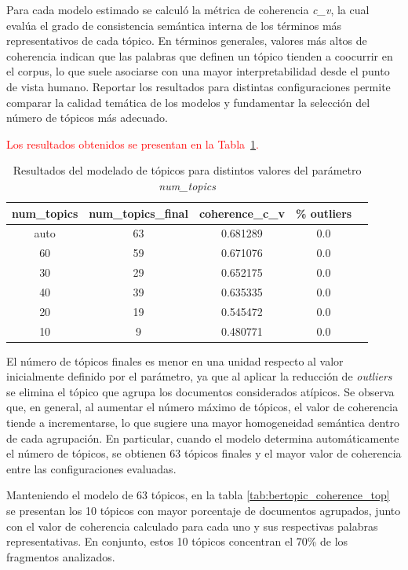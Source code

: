 \documentclass[11pt,a4paper]{article}
\begin{document}
Para cada modelo estimado se calculó la métrica de coherencia \textit{c\_v}, la cual evalúa el grado de consistencia semántica interna de los términos más representativos de cada tópico. En términos generales, valores más altos de coherencia indican que las palabras que definen un tópico tienden a coocurrir en el corpus, lo que suele asociarse con una mayor interpretabilidad desde el punto de vista humano. Reportar los resultados para distintas configuraciones permite comparar la calidad temática de los modelos y fundamentar la selección del número de tópicos más adecuado.

\textcolor{red}{Los resultados obtenidos se presentan en la Tabla~\ref{tab:coherence_topics}.}

\begin{table}[H]
	\centering
	\begin{tabular}{ccccc}
		\hline
		\textbf{num\_topics} & \textbf{num\_topics\_final} & \textbf{coherence\_c\_v} & \textbf{\% outliers} \\
		\hline
		auto & 63 & 0.681289 & 0.0 \\
		60   & 59 & 0.671076 & 0.0 \\
		30   & 29 & 0.652175 & 0.0 \\
		40   & 39 & 0.635335 & 0.0 \\
		20   & 19 & 0.545472 & 0.0 \\
		10   & 9  & 0.480771 & 0.0 \\
		\hline
	\end{tabular}
	\caption{Resultados del modelado de tópicos para distintos valores del parámetro \textit{num\_topics}}
	\label{tab:coherence_topics}
\end{table}

El número de tópicos finales es menor en una unidad respecto al valor inicialmente definido por el parámetro, ya que al aplicar la reducción de \emph{outliers} se elimina el tópico que agrupa los documentos considerados atípicos. Se observa que, en general, al aumentar el número máximo de tópicos, el valor de coherencia tiende a incrementarse, lo que sugiere una mayor homogeneidad semántica dentro de cada agrupación. En particular, cuando el modelo determina automáticamente el número de tópicos, se obtienen 63 tópicos finales y el mayor valor de coherencia entre las configuraciones evaluadas.

		
Manteniendo el modelo de 63 tópicos, en la tabla \ref{tab:bertopic_coherence_top} se presentan los 10 tópicos con mayor porcentaje de documentos agrupados, junto con el valor de coherencia calculado para cada uno y sus respectivas palabras representativas. En conjunto, estos 10 tópicos concentran el 70\% de los fragmentos analizados.
		
\end{document}

